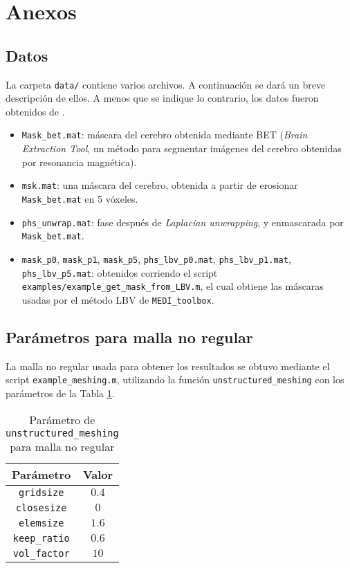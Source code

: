 \newpage
\section{Anexos} \label{anexos}

\subsection{Datos} \label{datos}

La carpeta \texttt{data/} contiene varios archivos. A continuación se dará un breve descripción de ellos. A menos que se indique lo contrario, los datos fueron obtenidos de \cite{challenge}.
\begin{itemize}
    \item \texttt{Mask\_bet.mat}: máscara del cerebro obtenida mediante BET (\textit{Brain Extraction Tool}, un método para segmentar imágenes del cerebro obtenidas por resonancia magnética).
    \item \texttt{msk.mat}: una máscara del cerebro, obtenida a partir de erosionar \texttt{Mask\_bet.mat} en 5 vóxeles.
    \item \texttt{phs\_unwrap.mat}: fase después de \textit{Laplacian unwrapping}, y enmascarada por \texttt{Mask\_bet.mat}.
    \item \texttt{mask\_p0}, \texttt{mask\_p1}, \texttt{mask\_p5}, \texttt{phs\_lbv\_p0.mat}, \texttt{phs\_lbv\_p1.mat}, \texttt{phs\_lbv\_p5.mat}: obtenidos corriendo el script \texttt{examples/example\_get\_mask\_from\_LBV.m}, el cual obtiene las máscaras usadas por el método LBV de \texttt{MEDI\_toolbox}.
\end{itemize}

\subsection{Parámetros para malla no regular}\label{noref}

La malla no regular usada para obtener los resultados se obtuvo mediante el script \texttt{example\_meshing.m}, utilizando la función \texttt{unstructured\_meshing} con los parámetros de la Tabla \ref{table:noreg}.

\begin{table}[h!]
\centering
\begin{tabular}{|c|c|}
\hline
Parámetro & Valor \\
\hline
\texttt{gridsize} & $0.4$ \\
\texttt{closesize} & $0$ \\
\texttt{elemsize} & $1.6$ \\
\texttt{keep\_ratio} & $0.6$ \\
\texttt{vol\_factor} & $10$ \\
\hline
\end{tabular}
\caption{Parámetro de \texttt{unstructured\_meshing} para malla no regular}
\label{table:noreg}
\end{table}


